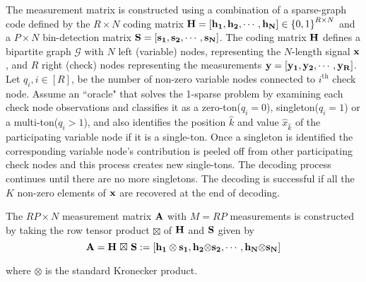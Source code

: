 The measurement matrix is constructed using a combination of a sparse-graph code defined by the $R \times N$ coding matrix ${\bf H=[h_1, h_2, \cdots ,h_{N}]} \in {\{0,1 \}}^{R \times N}$  and a $P \times N$ bin-detection matrix $\bf S=[s_1, s_2, \cdots ,s_N]$. The coding matrix $\bf H$ defines a bipartite graph $\mathcal{G}$ with $N$ left (variable) nodes, representing the $N$-length signal $\bf x$, and $R$ right (check) nodes representing the measurements  $\bf y=[y_1, y_2, \cdots, y_R]$. Let $q_i, i\in [R]$, be the number of non-zero variable nodes connected to $i^{\text{th}}$ check node. Assume an ``oracle" that solves the 1-sparse problem by examining each check node observations and classifies it as a zero-ton($q_i=0$), singleton($q_i=1$) or a multi-ton($q_i>1$), and also identifies the position $\hat{k}$ and value $\widehat{x}_{\hat{k}}$ of the participating variable node if it is a single-ton. Once a singleton is identified the corresponding variable node's contribution is peeled off from other participating check nodes and this process creates new single-tons. The decoding process continues until there are no more singletons. The decoding is successful if all the $K$ non-zero elements of $\bf x$ are recovered at the end of decoding.

The  $RP \times N $ measurement matrix $\bf A$ with $M = RP$ measurements is constructed by taking the row tensor product $ \boxtimes$ of $\bf H$ and $\bf S$ given by
\[
 \bf A = H \ { \boxtimes} \ S := [h_1 \otimes s_1, h_2 { \otimes} s_2, \cdots , h_N { \otimes} s_N]
 \]

where $\otimes$ is the standard Kronecker product.

